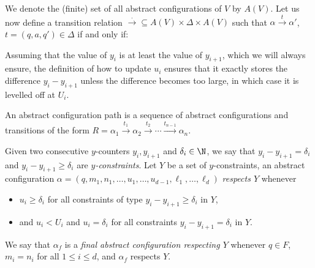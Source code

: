 We denote the (finite) set of all abstract configurations of $V$ by
$A(V)$. Let us now define a transition relation
${\xrightarrow{\cdot}}\subseteq A(V) \times \Delta \times A(V)$ such
that $\alpha\xrightarrow{t}\alpha'$, $t=(q,a,q')\in \Delta$ if and
only if:
%
%
Assuming that the value of $y_i$ is at least the value of $y_{i+1}$,
which we will always ensure, the definition of how to update $u_i$
ensures that it exactly stores the difference $y_i-y_{i+1}$ unless the
difference becomes too large, in which case it is levelled off at
$U_i$.

An abstract configuration path is a sequence of abstract
configurations and transitions of the form
$R=\alpha_1\xrightarrow{t_1} \alpha_2 \xrightarrow{t_2} \cdots
\xrightarrow{t_{n-1}} \alpha_n$.

Given two consecutive $y$-counters $y_i,y_{i+1}$ and $\delta_i\in \N$,
we say that $y_{i}-y_{i+1}=\delta_i$ and $y_{i}-y_{i+1}\geq \delta_i$
are \emph{$y$-constraints}. Let $Y$ be a set of $y$-constraints, an
abstract configuration
$\alpha=(q,m_1,n_1,\dots,u_1,\dots,u_{d-1},\ell_1,\dots,\ell_d)$
\emph{respects $Y$} whenever
%
\begin{itemize}
\item
  $u_i\geq \delta_i$
  for all constraints of type $y_{i}-y_{i+1} \geq \delta_i$ in $Y$,
\item and $u_i<U_i$ and $u_i=\delta_i$ for all constraints
  $y_{i}-y_{i+1} = \delta_i$ in $Y$.
\end{itemize}
%
We say that $\alpha_f$ is a \emph{final abstract configuration
  respecting $Y$} whenever $q\in F$, $m_i=n_i$ for all $1\leq i\leq
d$, and $\alpha_f$ respects $Y$.


